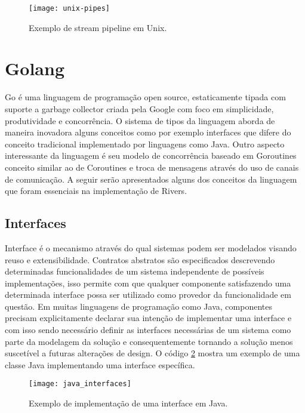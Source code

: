 \begin{figure}[H]
  \texttt{[image: unix-pipes]}
  \centering
  \caption{Exemplo de stream pipeline em Unix.}
  \label{fig:unix_pipes}
\end{figure}

\section{Golang}
\label{sec:golang}

Go é uma linguagem de programação open source, estaticamente tipada \cite{paper:microsoft:static_typing} com suporte a garbage collector \cite{paper:sun:gc} criada pela Google com foco em simplicidade, produtividade e concorrência. O sistema de tipos da linguagem aborda de maneira inovadora alguns conceitos como por exemplo interfaces \cite{article:wikipedia:interfaces} que difere do conceito tradicional implementado por linguagens como Java. Outro aspecto interessante da linguagem é seu modelo de concorrência baseado em Goroutines \cite{docs:golang:goroutine} conceito similar ao de Coroutines \cite{article:wikipedia:coroutines} e troca de mensagens \cite{lecture:ucl:message_passing} através do uso de canais de comunicação. A seguir serão apresentados alguns dos conceitos da linguagem que foram essenciais na implementação de Rivers.

\subsection{Interfaces}
\label{subsec:interfaces}

Interface é o mecanismo através do qual sistemas podem ser modelados visando reuso e extensibilidade. Contratos abstratos são especificados descrevendo determinadas funcionalidades de um sistema independente de possíveis implementações, isso permite com que qualquer componente satisfazendo uma determinada interface possa ser utilizado como provedor da funcionalidade em questão. Em muitas linguagens de programação como Java, componentes precisam explicitamente declarar sua intenção de implementar uma interface e com isso sendo necessário definir as interfaces necessárias de um sistema como parte da modelagem da solução e consequentemente tornando a solução menos suscetível a futuras alterações de design. O código \ref{code:java:interfaces} mostra um exemplo de uma classe Java implementando uma interface específica.

\begin{figure}[H]
  \texttt{[image: java\_interfaces]}
  \centering
  \caption{Exemplo de implementação de uma interface em Java.}
  \label{code:java:interfaces}
\end{figure}

